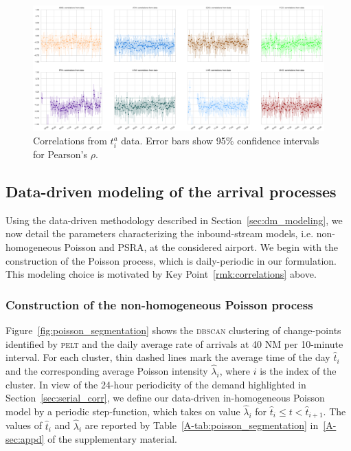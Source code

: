 \documentclass[draft,review]{elsarticle}
\makeatletter
\newcommand*{\ie}{i.e.\@\xspace}
\newcommand{\PELT}{\textsc{pelt}}
\newcommand{\DBSCAN}{\textsc{dbscan}}
\makeatother
\begin{document}
\begin{figure}
    \includegraphics[width=\textwidth]{correlations_true}
    \caption{Correlations from \(t^{a}_i\) data. Error bars show 95\% confidence intervals for Pearson's \(\rho\).}
    \label{fig:correlations_true}
\end{figure}

\subsection{Data-driven modeling of the arrival processes}\label{sec:modeling}

Using the data-driven methodology described in Section~\ref{sec:dm_modeling}, we now detail the parameters characterizing the inbound-stream models, \ie{} non-homogeneous Poisson and \ac{PSRA}, at the considered airport.
We begin with the construction of the Poisson process, which is daily-periodic in our formulation.
This modeling choice is motivated by Key Point~\ref{rmk:correlations} above.

\subsubsection{Construction of the non-homogeneous Poisson process}\label{sec:pois}

Figure~\ref{fig:poisson_segmentation} shows the \DBSCAN{} clustering of change-points identified by \PELT{} and the daily average rate of arrivals at 40 NM per 10-minute  interval.
For each cluster, thin dashed lines mark the average time of the day \(\hat{t}_i\) and the corresponding average Poisson intensity \(\hat{\lambda}_i\), where \(i\) is the index of the cluster.
In view of the 24-hour periodicity of the demand highlighted in Section~\ref{sec:serial_corr}, we define our data-driven in-homogeneous Poisson model by a periodic step-function, which takes on value \(\hat{\lambda}_i\) for \(\hat{t}_i \leq t < \hat{t}_{i+1}\).
The values of \(\hat{t}_i\) and \(\hat{\lambda}_i\) are reported by Table~\ref{A-tab:poisson_segmentation} in~\ref{A-sec:appd} of the supplementary material.
\end{document}
